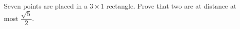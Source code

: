 Seven points are placed in a $3\times1$ rectangle. Prove that two are at distance at most $\dfrac{\sqrt5}{2}$.
